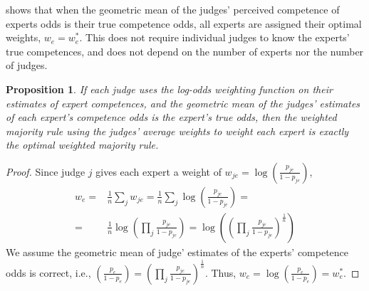 \documentclass[letterpaper]{article} %
\newtheorem{proposition}{Proposition}
\newtheorem{corollary}{Corollary}
\newcommand{\judge}{\ensuremath{j} }
\newcommand{\experts}{\ensuremath{E} }
\newcommand{\expert}{\ensuremath{e} }
\begin{document}
 shows that when the geometric mean of the judges' perceived competence of experts odds is their true competence odds,
all experts are assigned their optimal weights, $w_\expert = w^*_\expert$. This does not require individual judges to know the experts' true competences, and does not depend on the number of experts nor the number of judges.

\begin{proposition}\label{theorem:optimal}
If each judge uses the log-odds weighting function on their estimates of expert competences, and the geometric mean of the judges' estimates of each expert's competence odds is the expert's true odds, then the weighted majority rule using the judges' average weights to weight each expert is exactly the optimal weighted majority rule.
\end{proposition}

\begin{proof}
Since judge $\judge$ gives each expert a weight of $w_{\judge\expert} = \log ( \frac{p_{\judge\expert}}{1-p_{\judge\expert}} )$,
\scriptsize
\begin{align*}
 w_\expert = &\frac{1}{n} \sum\limits_\judge w_{\judge\expert} = \frac{1}{n} \sum\limits_\judge \log ( \frac{p_{\judge\expert}}{1-p_{\judge\expert}} )=\\
 = &\frac{1}{n} \log ( \prod_\judge \frac{p_{\judge\expert}}{1-p_{\judge\expert}} )= \log ( ( \prod_\judge \frac{p_{\judge\expert}}{1-p_{\judge\expert}} )^\frac{1}{n} )
\end{align*}
\normalsize
We assume the geometric mean of judge' estimates of the experts' competence odds is correct, i.e., $( \frac{p_\expert}{1-p_\expert}) = (\prod\limits_\judge \frac{p_{\judge\expert}}{1-p_{\judge\expert}} )^\frac{1}{n}$. Thus, $w_\expert = \log( \frac{p_\expert}{1-p_\expert}) = w^*_\expert$.
\end{proof}


\end{document}
